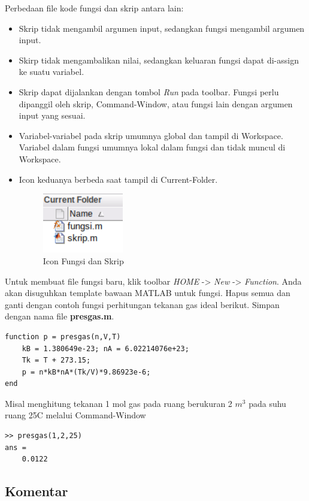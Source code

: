 \documentclass[12pt]{book}
\begin{document}
	Perbedaan file kode fungsi dan skrip antara lain:
	\begin{itemize}
		\item Skrip tidak mengambil argumen input, sedangkan fungsi mengambil argumen input.
		\item Skirp tidak mengambalikan nilai, sedangkan keluaran fungsi dapat di-assign ke suatu variabel.
		\item Skrip dapat dijalankan dengan tombol \textit{Run} pada toolbar.
		Fungsi perlu dipanggil oleh skrip, Command-Window, atau fungsi lain dengan argumen input yang sesuai.
		\item Variabel-variabel pada skrip umumnya global dan tampil di Workspace.
		 Variabel dalam fungsi umumnya lokal dalam fungsi dan tidak muncul di Workspace.
		\item Icon keduanya berbeda saat tampil di Current-Folder.
		\begin{figure}[!ht]
			\centering
			\includegraphics[width=100pt]{images/iconfile}
			\caption{Icon Fungsi dan Skrip}
		\end{figure}
	\end{itemize}

	Untuk membuat file fungsi baru, klik toolbar \textit{HOME} -> \textit{New} -> \textit{Function}.
	Anda akan disuguhkan template bawaan MATLAB untuk fungsi.
	Hapus semua dan ganti dengan contoh fungsi perhitungan tekanan gas ideal berikut.
	Simpan dengan nama file \textbf{presgas.m}.
	
	\begin{verbatim}
function p = presgas(n,V,T)
	kB = 1.380649e-23; nA = 6.02214076e+23;
	Tk = T + 273.15;
	p = n*kB*nA*(Tk/V)*9.86923e-6;
end
	\end{verbatim}

	Misal menghitung tekanan 1 mol gas pada ruang berukuran 2 $m^3$ pada suhu ruang 25\textdegree C melalui Command-Window
	\begin{verbatim}
>> presgas(1,2,25)
ans =
    0.0122
	\end{verbatim}
	
	\subsection{Komentar}
	
\end{document}
